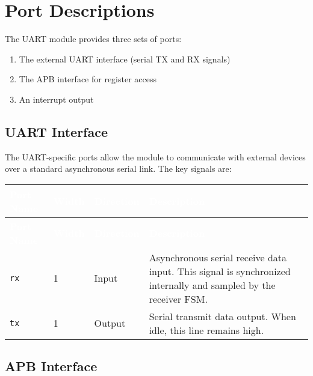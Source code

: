 \section{Port Descriptions}

The UART module provides three sets of ports:
\begin{enumerate}
  \item The external UART interface (serial TX and RX signals)
  \item The APB interface for register access
  \item An interrupt output
\end{enumerate}

\subsection{UART Interface}

The UART-specific ports allow the module to communicate with external devices over a standard asynchronous serial link. The key signals are:

\renewcommand*{\arraystretch}{1.3}
\begingroup
\small
{}
\begin{longtable}[H]{
  | p{}
  | p{}
  | p{}
  | p{} |
}
\hline
\rowcolor{gray}
\textcolor{white}{\textbf{Port Name}} &
\textcolor{white}{\textbf{Width}} &
\textcolor{white}{\textbf{Direction}} &
\textcolor{white}{\textbf{Description}} \\ \hline
\endfirsthead

\hline
\rowcolor{gray}
\textcolor{white}{\textbf{Port Name}} &
\textcolor{white}{\textbf{Width}} &
\textcolor{white}{\textbf{Direction}} &
\textcolor{white}{\textbf{Description}} \\ \hline
\endhead

\hline
\endfoot

\texttt{rx} &
1 &
Input &
Asynchronous serial receive data input. This signal is synchronized internally and sampled by the receiver FSM. \\ \hline

\texttt{tx} &
1 &
Output &
Serial transmit data output. When idle, this line remains high. \\ \hline
\end{longtable}
\label{table:uart_ports}
\endgroup

\subsection{APB Interface}

